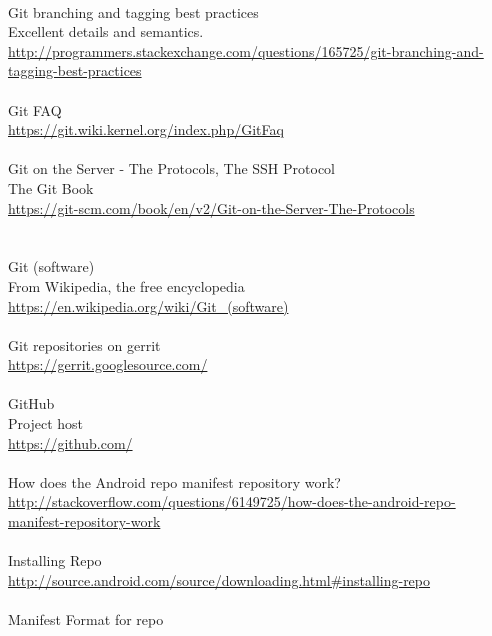 \documentclass[12pt,letterpaper,dvips]{article}
\begin{document}
\\
Git branching and tagging best practices\\
Excellent details and semantics.\\
\href{http://programmers.stackexchange.com/questions/165725/git-branching-and-tagging-best-practices}{http://programmers.stackexchange.com/questions/165725/git-branching-and-tagging-best-practices}
\\
\\
Git FAQ\\
\href{https://git.wiki.kernel.org/index.php/GitFaq}{https://git.wiki.kernel.org/index.php/GitFaq}
\\
\\
Git on the Server - The Protocols, The SSH Protocol\\
The Git Book\\
\href{https://git-scm.com/book/en/v2/Git-on-the-Server-The-Protocols}{https://git-scm.com/book/en/v2/Git-on-the-Server-The-Protocols}\\
\\
\\
Git (software)\\
From Wikipedia, the free encyclopedia\\
\href{https://en.wikipedia.org/wiki/Git\_(software)}{https://en.wikipedia.org/wiki/Git\_(software)}
\\
\\
\noindent Git repositories on gerrit\\
\href{https://gerrit.googlesource.com/}{https://gerrit.googlesource.com/}
\\
\\
GitHub\\
Project host\\
\href{https://github.com/}{https://github.com/}
\\
\\
How does the Android repo manifest repository work?\\
\href{http://stackoverflow.com/questions/6149725/how-does-the-android-repo-manifest-repository-work}
{http://stackoverflow.com/questions/6149725/how-does-the-android-repo-manifest-repository-work}
\\
\\
Installing Repo\\
\href{http://source.android.com/source/downloading.html\#installing-repo}{http://source.android.com/source/downloading.html\#installing-repo}
\\
\\
Manifest Format for repo\\
\end{document}
